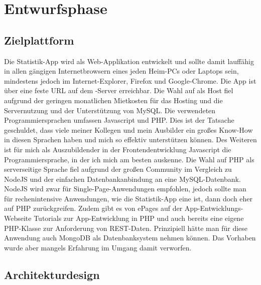 \section{Entwurfsphase} 
\label{sec:Entwurfsphase}

\subsection{Zielplattform}
\label{sec:Zielplattform}

Die Statistik-App wird als Web-Applikation entwickelt und sollte damit lauffähig in allen gängigen Internetbrowsern eines jeden Heim-PCs oder Laptops sein, mindestens jedoch im Internet-Explorer, Firefox und Google-Chrome. Die App ist über eine feste URL auf dem -Server erreichbar. Die Wahl auf  als Host fiel aufgrund der geringen monatlichen Mietkosten für das Hosting und die Servernutzung und der Unterstützung von MySQL. Die verwendeten Programmiersprachen umfassen Javascript und PHP. Dies ist der Tatsache geschuldet, dass viele meiner Kollegen und mein Ausbilder ein großes Know-How in diesen Sprachen haben und mich so effektiv unterstützen können. Des Weiteren ist für mich als Auszubildender in der Frontendentwicklung Javascript die Programmiersprache, in der ich mich am besten auskenne. Die Wahl auf PHP als serverseitige Sprache fiel aufgrund der großen Community im Vergleich zu NodeJS und der einfachen Datenbankanbindung an eine MySQL-Datenbank. NodeJS wird zwar für Single-Page-Anwendungen empfohlen, jedoch sollte man für rechenintensive Anwendungen, wie die Statistik-App eine ist, dann doch eher auf PHP zurückgreifen. Zudem gibt es von ePages auf der App-Entwicklungs-Webseite Tutorials zur App-Entwicklung in PHP und auch bereits eine eigene PHP-Klasse zur Anforderung von REST-Daten. Prinzipiell hätte man für diese Anwendung auch MongoDB als Datenbanksystem nehmen können. Das Vorhaben wurde aber mangels Erfahrung im Umgang damit verworfen.

\subsection{Architekturdesign}
\label{sec:Architekturdesign}

